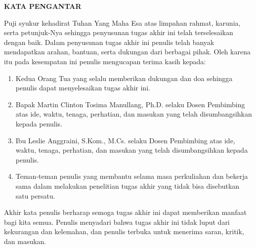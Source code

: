\clearpage
{}%

\begin{justifying}
	\large \bfseries \centering \MakeUppercase{Kata Pengantar}\linebreak
	
	\normalsize \normalfont \justifying
	Puji syukur kehadirat Tuhan Yang Maha Esa atas limpahan rahmat, karunia, serta petunjuk-Nya sehingga penyusunan tugas akhir ini telah terselesaikan dengan baik. Dalam penyusunan tugas akhir ini penulis telah banyak mendapatkan arahan, bantuan, serta dukungan dari berbagai pihak. Oleh karena itu pada kesempatan ini penulis mengucapan terima kasih kepada: \par
	\begin{enumerate}
        \item Kedua Orang Tua yang selalu memberikan dukungan dan doa sehingga penulis dapat menyelesaikan tugas akhir ini.
		\item Bapak Martin Clinton Tosima Manullang, Ph.D. selaku Dosen Pembimbing atas ide, waktu, tenaga, perhatian, dan masukan yang telah disumbangsihkan kepada penulis.
		\item Ibu Leslie Anggraini, S.Kom., M.Cs. selaku Dosen Pembimbing atas ide, waktu, tenaga, perhatian, dan masukan yang telah disumbangsihkan kepada penulis.
		\item Teman-teman penulis yang membantu selama masa perkuliahan dan bekerja sama dalam melakukan penelitian tugas akhir yang tidak bisa disebutkan satu persatu.
	\end{enumerate} \par
	Akhir kata penulis berharap semoga tugas akhir ini dapat memberikan manfaat bagi kita semua. Penulis menyadari bahwa tugas akhir ini tidak luput dari kekurangan dan kelemahan, dan penulis  terbuka untuk menerima saran, kritik, dan masukan.
	\vfill
	
\end{justifying}
\clearpage





